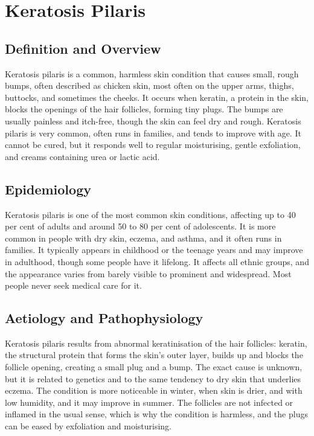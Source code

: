 \chapter{Keratosis Pilaris}

\section*{Definition and Overview}
Keratosis pilaris is a common, harmless skin condition that causes small, rough bumps, often described as chicken skin, most often on the upper arms, thighs, buttocks, and sometimes the cheeks. It occurs when keratin, a protein in the skin, blocks the openings of the hair follicles, forming tiny plugs. The bumps are usually painless and itch-free, though the skin can feel dry and rough. Keratosis pilaris is very common, often runs in families, and tends to improve with age. It cannot be cured, but it responds well to regular moisturising, gentle exfoliation, and creams containing urea or lactic acid.

\section*{Epidemiology}
Keratosis pilaris is one of the most common skin conditions, affecting up to 40 per cent of adults and around 50 to 80 per cent of adolescents. It is more common in people with dry skin, eczema, and asthma, and it often runs in families. It typically appears in childhood or the teenage years and may improve in adulthood, though some people have it lifelong. It affects all ethnic groups, and the appearance varies from barely visible to prominent and widespread. Most people never seek medical care for it.

\section*{Aetiology and Pathophysiology}
Keratosis pilaris results from abnormal keratinisation of the hair follicles: keratin, the structural protein that forms the skin's outer layer, builds up and blocks the follicle opening, creating a small plug and a bump. The exact cause is unknown, but it is related to genetics and to the same tendency to dry skin that underlies eczema. The condition is more noticeable in winter, when skin is drier, and with low humidity, and it may improve in summer. The follicles are not infected or inflamed in the usual sense, which is why the condition is harmless, and the plugs can be eased by exfoliation and moisturising.

